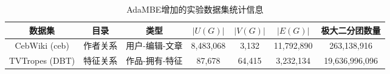 \begin{table} [t]
	\centering    
	\setlength{\abovecaptionskip}{0cm}  
  \setlength{\belowcaptionskip}{-0.1cm}
	\caption{AdaMBE增加的实验数据集统计信息}      
	\label{tbl:ada_datasets}
	\setlength{\tabcolsep}{2pt}
	\begin{center}
				\small{
		\begin{tabular}{|c|c|c|c|c|c|c|}
			\hline 
			\textbf{数据集} &\textbf{目录} &\textbf{类型} & \textbf{$|U(G)|$} & \textbf{$|V(G)|$} & \textbf{$|E(G)|$} &\textbf{极大二分团数量}\\
			\hline
      CebWiki (ceb) & 作者关系 & 用户-编辑-文章 & 8,483,068 & 3,132 & 11,792,890 & 263,138,916\\
			TVTropes (DBT) & 特征关系 & 作品-拥有-特征 & 87,678 & 64,415 & 3,232,134 & 19,636,996,096 \\ 

\end{tabular}}
\end{center}
\end{table}
